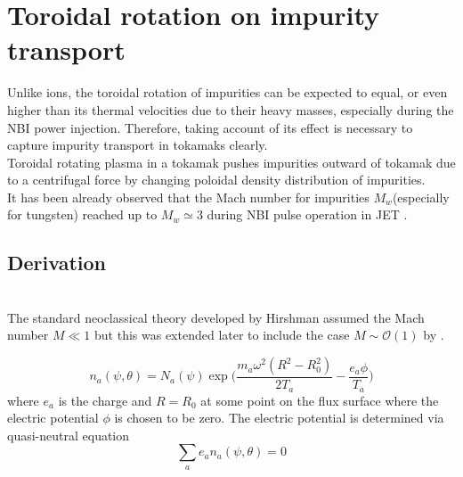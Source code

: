 \chapter{Toroidal rotation on impurity transport}
\minitoc
Unlike ions, the toroidal rotation of impurities can be expected to equal, or even higher than its thermal velocities due to their heavy masses, especially during the NBI power injection. Therefore, taking account of its effect is necessary to capture impurity transport in tokamaks clearly. \\
Toroidal rotating plasma in a tokamak pushes impurities outward of tokamak due to a centrifugal force by changing poloidal density distribution of impurities. \\
It has been already observed that the Mach number for impurities $M_w$(especially for tungsten) reached up to $M_w \simeq 3$ during NBI pulse operation in JET \citep{Angioni14}.

\section{Derivation}
\citep{Wong87, Hinton85, Fulop99, Helander98, Wesson97} \\
The standard neoclassical theory developed by Hirshman assumed the Mach number $M \ll 1$ but this was extended later to include the case $ M \sim \mathcal{O}(1)$ by \citep{Hinton85}.

\begin{equation}
    n_a(\psi, \theta) = N_a(\psi)\exp{\Bigg(\frac{m_a\omega^2(R^2-R_0^2)}{2T_a}-\frac{e_a\phi}{T_a}\Bigg)}
\end{equation}
where $e_a$ is the charge and $R=R_0$ at some point on the flux surface where the electric potential $\phi$ is chosen to be zero. The electric potential is determined via quasi-neutral equation 
\begin{equation}
    \sum_a e_an_a(\psi,\theta)=0
\end{equation}

